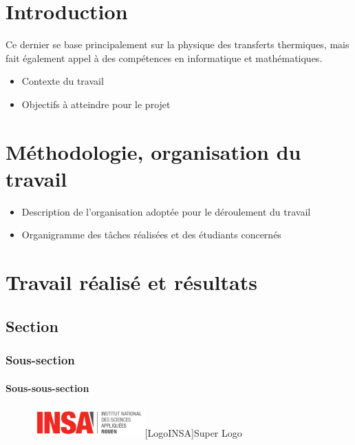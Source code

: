 \documentclass[a4paper, 12pt]{report} %
\begin{document}

\newpage
\chapter*{Introduction}				

Ce dernier se base principalement 
sur la physique des transferts thermiques, mais fait également
appel à des compétences en informatique et mathématiques. 
\begin{itemize}
\item Contexte du travail
	  
\item Objectifs à atteindre pour le projet
\end{itemize}


\chapter{Méthodologie, organisation du travail}

\begin{itemize}
\item Description de l’organisation adoptée pour le déroulement du travail
\item Organigramme des tâches réalisées et des étudiants concernés
\end{itemize}


\chapter{Travail réalisé et résultats}

	\section{Section}

		\subsection{Sous-section}

			\subsubsection{Sous-sous-section}


\begin{figure}[h]
\centering
\vspace{-0.6cm} 
\includegraphics[width=43mm]{Images/Logo INSA.png}[LogoINSA]{Super Logo}
\end{figure}
\end{document}
